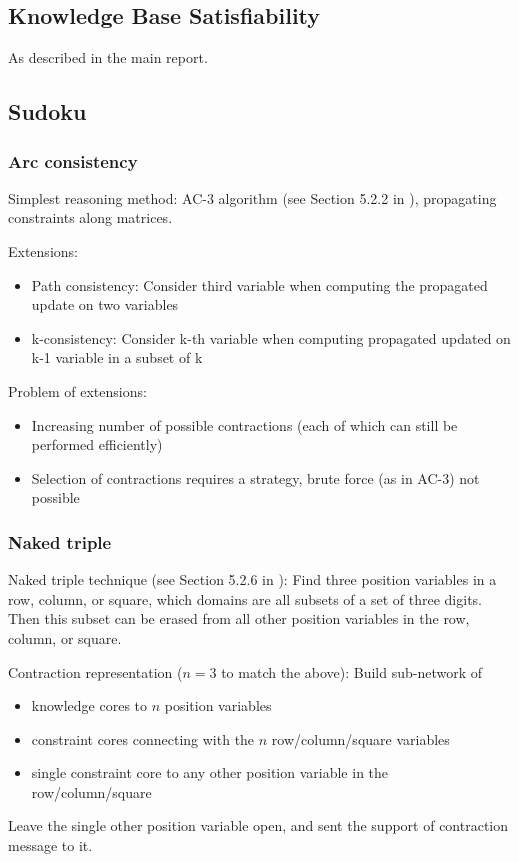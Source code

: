 \documentclass[aps,onecolumn,nofootinbib,pra]{article}
\begin{document}
    \subsection{Knowledge Base Satisfiability}

    As described in the main report.

    \subsection{Sudoku}

    \subsubsection{Arc consistency}

    Simplest reasoning method: AC-3 algorithm (see Section 5.2.2 in \cite{russell_artificial_2021}), propagating constraints along matrices.

    Extensions:
    \begin{itemize}
        \item Path consistency: Consider third variable when computing the propagated update on two variables
        \item k-consistency: Consider k-th variable when computing propagated updated on k-1 variable in a subset of k
    \end{itemize}
    Problem of extensions:
    \begin{itemize}
        \item Increasing number of possible contractions (each of which can still be performed efficiently)
        \item Selection of contractions requires a strategy, brute force (as in AC-3) not possible
    \end{itemize}

    \subsubsection{Naked triple}

    Naked triple technique (see Section 5.2.6 in \cite{russell_artificial_2021}):
    Find three position variables in a row, column, or square, which domains are all subsets of a set of three digits.
    Then this subset can be erased from all other position variables in the row, column, or square.

    Contraction representation ($n=3$ to match the above):
    Build sub-network of
    \begin{itemize}
        \item knowledge cores to $n$ position variables
        \item constraint cores connecting with the $n$ row/column/square variables
        \item single constraint core to any other position variable in the row/column/square
    \end{itemize}
    Leave the single other position variable open, and sent the support of contraction message to it.
\end{document}
